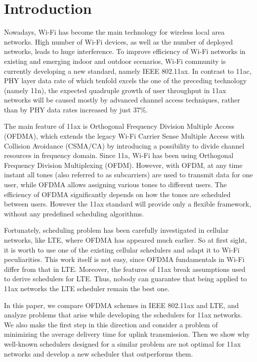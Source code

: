 \section{Introduction}
Nowadays, Wi-Fi has become the main technology for wireless local area networks. High number of Wi-Fi devices, as well as the number of deployed networks, leads to huge interference. To improve efficiency of Wi-Fi networks in existing and emerging indoor and outdoor scenarios, Wi-Fi community is currently developing a new standard, namely IEEE 802.11ax. 
In contrast to 11ac, PHY layer data rate of which tenfold excels the one of the preceding technology (namely 11n), the expected quadruple growth of user throughput in 11ax networks will be caused mostly by advanced channel access techniques, rather than by PHY data rates increased by just 37\%.

The main feature of 11ax is Orthogonal Frequency Division Multiple Access (OFDMA), which extends the legacy Wi-Fi Carrier Sense Multiple Access with Collision Avoidance (CSMA/CA) by introducing a possibility to divide channel resources in frequency domain. Since 11a, Wi-Fi has been using Orthogonal Frequency Division Multiplexing (OFDM). However, with OFDM, at any time instant all tones (also referred to as subcarriers) are used to transmit data for one user, while OFDMA allows assigning various tones to different users. The efficiency of OFDMA significantly depends on how the tones are scheduled between users. However the 11ax standard will provide only a flexible framework, without any predefined scheduling algorithms. 

Fortunately, scheduling problem has been carefully investigated in cellular networks, like LTE, where OFDMA has appeared much earlier. So at first sight, it is worth to use one of the existing cellular schedulers and adapt it to Wi-Fi peculiarities. This work itself is not easy, since OFDMA fundamentals in Wi-Fi differ from that in LTE. Moreover, the features of 11ax break assumptions used to derive schedulers for LTE. Thus, nobody can guarantee that being applied to 11ax networks the LTE scheduler remain the best one. 

In this paper, we compare OFDMA schemes in IEEE 802.11ax and LTE, and analyze problems that arise while developing the schedulers for 11ax networks. We also make the first step in this direction and consider a problem of minimizing the average delivery time for uplink transmission. Then we show why well-known schedulers designed for a similar problem are not optimal for 11ax networks and develop a new scheduler that outperforms them. 

